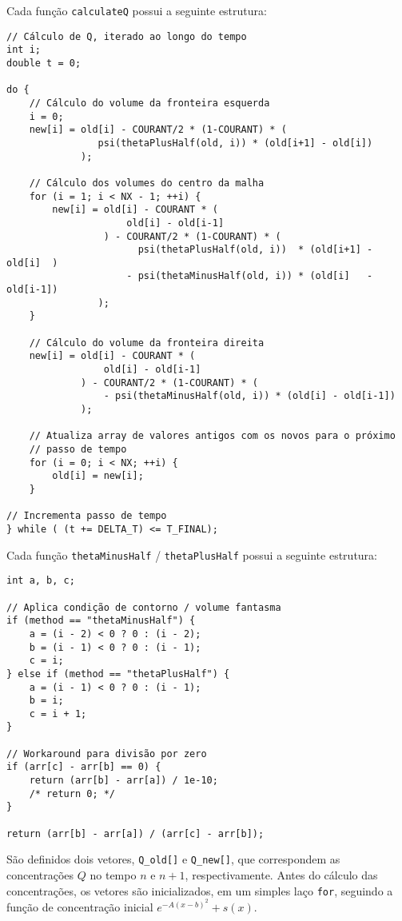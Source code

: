 \noindent Cada função \verb|calculateQ| possui a seguinte estrutura:
\begin{Verbatim}[fontsize=\footnotesize]
// Cálculo de Q, iterado ao longo do tempo
int i;
double t = 0;

do {
    // Cálculo do volume da fronteira esquerda
    i = 0;
    new[i] = old[i] - COURANT/2 * (1-COURANT) * (
                psi(thetaPlusHalf(old, i)) * (old[i+1] - old[i])
             );

    // Cálculo dos volumes do centro da malha
    for (i = 1; i < NX - 1; ++i) {
        new[i] = old[i] - COURANT * (
                     old[i] - old[i-1]
                 ) - COURANT/2 * (1-COURANT) * (
                       psi(thetaPlusHalf(old, i))  * (old[i+1] - old[i]  )
                     - psi(thetaMinusHalf(old, i)) * (old[i]   - old[i-1])
                );
    }

    // Cálculo do volume da fronteira direita
    new[i] = old[i] - COURANT * (
                 old[i] - old[i-1]
             ) - COURANT/2 * (1-COURANT) * (
                 - psi(thetaMinusHalf(old, i)) * (old[i] - old[i-1])
             );

    // Atualiza array de valores antigos com os novos para o próximo
    // passo de tempo
    for (i = 0; i < NX; ++i) {
        old[i] = new[i];
    }

// Incrementa passo de tempo
} while ( (t += DELTA_T) <= T_FINAL);
\end{Verbatim}

\noindent Cada função \verb|thetaMinusHalf| / \verb|thetaPlusHalf| possui a
seguinte estrutura:
\begin{Verbatim}[fontsize=\footnotesize]
int a, b, c;

// Aplica condição de contorno / volume fantasma
if (method == "thetaMinusHalf") {
    a = (i - 2) < 0 ? 0 : (i - 2);
    b = (i - 1) < 0 ? 0 : (i - 1);
    c = i;
} else if (method == "thetaPlusHalf") {
    a = (i - 1) < 0 ? 0 : (i - 1);
    b = i;
    c = i + 1;
}

// Workaround para divisão por zero
if (arr[c] - arr[b] == 0) {
    return (arr[b] - arr[a]) / 1e-10;
    /* return 0; */
}

return (arr[b] - arr[a]) / (arr[c] - arr[b]);
\end{Verbatim}

São definidos dois vetores, \verb|Q_old[]| e \verb|Q_new[]|, que correspondem as
concentrações $Q$ no tempo $n$ e $n+1$, respectivamente. Antes do cálculo das
concentrações, os vetores são inicializados, em um simples laço \verb|for|,
seguindo a função de concentração inicial $e^{-A(x-b)^2} + s(x)$.

